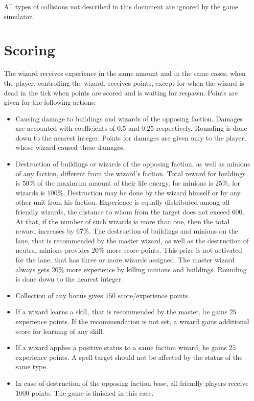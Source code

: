 All types of collisions not described in this document are ignored by the game simulator.
 
\section{Scoring}
 
The wizard receives experience in the same amount and in the same cases, when the player, controlling the wizard, receives points, except for when
the wizard is dead in the tick when points are scored and is waiting for respawn. Points are given for the following actions:
\begin{itemize}
    \item Causing damage to buildings and wizards of the opposing faction. Damages are accounted with coefficients of $0.5$ and $0.25$
        respectively. Rounding is done down to the nearest integer. Points for damages are given only to the player, whose wizard caused
        these damages.
    \item Destruction of buildings or wizards of the opposing faction, as well as minions of any faction, different from the wizard's faction.
        Total reward for buildings is $50\%$ of the maximum amount of their life energy, for minions is $25\%$, for wizards is $100\%$. Destruction
        may be done by the wizard himself or by any other unit from his faction. Experience is equally
        distributed among all friendly wizards, the distance to whom from the target does not exceed $600$. At that, if the number of
        such wizards is more than one, then the total reward increases by $67\%$. The destruction of buildings and minions on the lane, that
        is recommended by the master wizard, as well as the destruction of neutral minions provides $20\%$ more score points. This prize is
        not activated for the lane, that has three or more wizards assigned. The master wizard always gets $20\%$ more experience by killing
        minions and buildings. Rounding is done down to the nearest integer.
    \item Collection of any bonus gives $150$ score/experience points.
    \item If a wizard learns a skill, that is recommended by the master, he gains $25$ experience points. If the recommendation is not set,
        a wizard gains additional score for learning of any skill.
    \item If a wizard applies a positive status to a same faction wizard, he gains $25$ experience points. A spell target should not be
        affected by the status of the same type.
    \item In case of destruction of the opposing faction base, all friendly players receive $1000$ points. The game is finished in this case.
\end{itemize}
 
